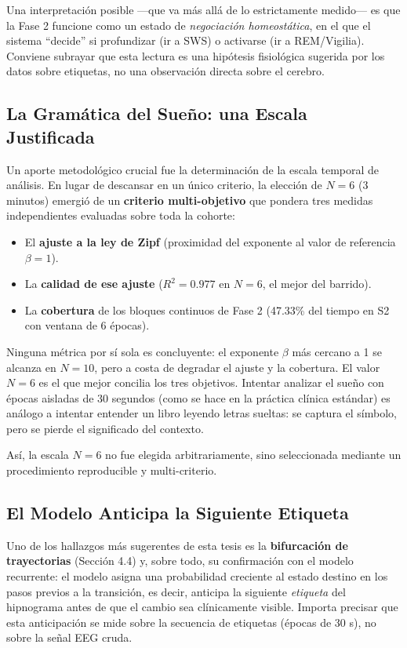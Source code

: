 Una interpretación posible ---que va más allá de lo estrictamente medido--- es que la Fase 2 funcione como un estado de \textit{negociación homeostática}, en el que el sistema ``decide'' si profundizar (ir a SWS) o activarse (ir a REM/Vigilia). Conviene subrayar que esta lectura es una hipótesis fisiológica sugerida por los datos sobre etiquetas, no una observación directa sobre el cerebro.

\subsection{La Gramática del Sueño: una Escala Justificada}

Un aporte metodológico crucial fue la determinación de la escala temporal de análisis. En lugar de descansar en un único criterio, la elección de $N=6$ (3 minutos) emergió de un \textbf{criterio multi-objetivo} que pondera tres medidas independientes evaluadas sobre toda la cohorte:

\begin{itemize}
    \item El \textbf{ajuste a la ley de Zipf} (proximidad del exponente al valor de referencia $\beta=1$).
    \item La \textbf{calidad de ese ajuste} ($R^2 = 0.977$ en $N=6$, el mejor del barrido).
    \item La \textbf{cobertura} de los bloques continuos de Fase 2 (47.33\% del tiempo en S2 con ventana de 6 épocas).
\end{itemize}

Ninguna métrica por sí sola es concluyente: el exponente $\beta$ más cercano a 1 se alcanza en $N=10$, pero a costa de degradar el ajuste y la cobertura. El valor $N=6$ es el que mejor concilia los tres objetivos. Intentar analizar el sueño con épocas aisladas de 30 segundos (como se hace en la práctica clínica estándar) es análogo a intentar entender un libro leyendo letras sueltas: se captura el símbolo, pero se pierde el significado del contexto.

Así, la escala $N=6$ no fue elegida arbitrariamente, sino seleccionada mediante un procedimiento reproducible y multi-criterio.

\subsection{El Modelo Anticipa la Siguiente Etiqueta}

Uno de los hallazgos más sugerentes de esta tesis es la \textbf{bifurcación de trayectorias} (Sección 4.4) y, sobre todo, su confirmación con el modelo recurrente: el modelo asigna una probabilidad creciente al estado destino en los pasos previos a la transición, es decir, anticipa la siguiente \textit{etiqueta} del hipnograma antes de que el cambio sea clínicamente visible. Importa precisar que esta anticipación se mide sobre la secuencia de etiquetas (épocas de 30 s), no sobre la señal EEG cruda.

